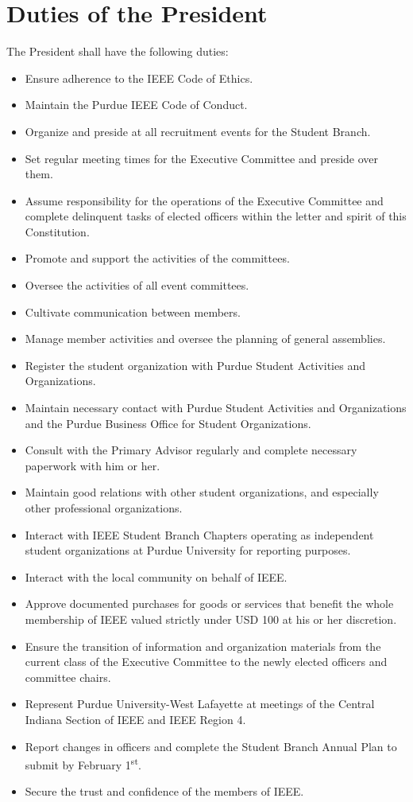 \documentclass[12pt]{constitution}
\newcommand{\dateannualplansubmit}{February 1\textsuperscript{st}} %
\begin{document}
\section{Duties of the President}
\label{sec:officer_pres}
The President shall have the following duties:
\begin{itemize}
    \item Ensure adherence to the IEEE Code of Ethics.
    \item Maintain the Purdue IEEE Code of Conduct.
    \item Organize and preside at all recruitment events for the Student Branch.
    \item Set regular meeting times for the Executive Committee and preside over them.
    \item Assume responsibility for the operations of the Executive Committee and complete delinquent tasks of elected officers within the letter and spirit of this Constitution.
    \item Promote and support the activities of the committees.
    \item Oversee the activities of all event committees.
    \item Cultivate communication between members.
    \item Manage member activities and oversee the planning of general assemblies.
    \item Register the student organization with Purdue Student Activities and Organizations.
    \item Maintain necessary contact with Purdue Student Activities and Organizations and the Purdue Business Office for Student Organizations.
    \item Consult with the Primary Advisor regularly and complete necessary paperwork with him or her.
    \item Maintain good relations with other student organizations, and especially other professional organizations.
    \item Interact with IEEE Student Branch Chapters operating as independent student organizations at Purdue University for reporting purposes.
    \item Interact with the local community on behalf of IEEE.
    \item Approve documented purchases for goods or services that benefit the whole membership of IEEE valued strictly under USD 100 at his or her discretion.
    \item Ensure the transition of information and organization materials from the current class of the Executive Committee to the newly elected officers and committee chairs.
    \item Represent Purdue University-West Lafayette at meetings of the Central Indiana Section of IEEE and IEEE Region 4.
    \item Report changes in officers and complete the Student Branch Annual Plan to submit by \dateannualplansubmit{}.
    \item Secure the trust and confidence of the members of IEEE.
\end{itemize}
\end{document}
